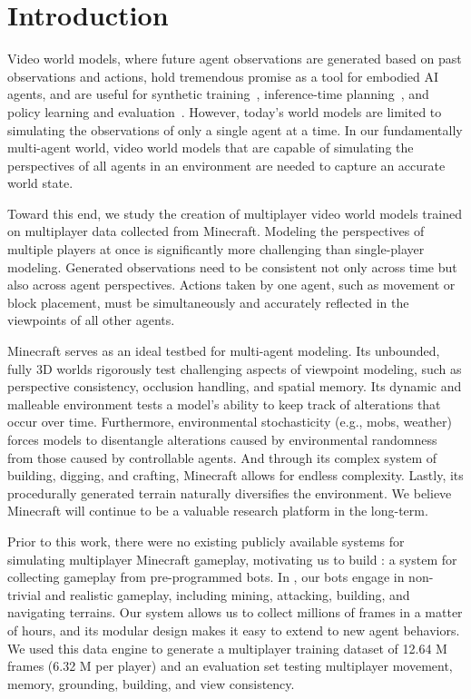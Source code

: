 \section{Introduction}
\label{sec:intro}


Video world models, where future agent observations are generated based on past observations and actions, hold tremendous promise as a tool for embodied AI agents, and are useful for synthetic training~\cite{ali2025world, yang2024video}, inference-time planning~\cite{zhou2024dino, assran2025v}, and policy learning and evaluation~\cite{du2023learning, jang2025dreamgen, quevedo2026worldgym}. However, today’s world models are limited to simulating the observations of only a single agent at a time. In our fundamentally multi-agent world, video world models that are capable of simulating the perspectives of all agents in an environment are needed to capture an accurate world state. 

Toward this end, we study the creation of multiplayer video world models trained on multiplayer data collected from Minecraft. Modeling the perspectives of multiple players at once is significantly more challenging than single-player modeling. Generated observations need to be consistent not only across time but also across agent perspectives. Actions taken by one agent, such as movement or block placement, must be simultaneously and accurately reflected in the viewpoints of all other agents.


Minecraft serves as an ideal testbed for multi-agent modeling. Its unbounded, fully 3D worlds rigorously test challenging aspects of viewpoint modeling, such as perspective consistency, occlusion handling, and spatial memory. Its dynamic and malleable environment tests a model’s ability to keep track of alterations that occur over time. Furthermore, environmental stochasticity (e.g., mobs, weather) forces models to disentangle alterations caused by environmental randomness from those caused by controllable agents. And through its complex system of building, digging, and crafting, Minecraft allows for endless complexity. Lastly, its procedurally generated terrain naturally diversifies the environment. We believe Minecraft will continue to be a valuable research platform in the long-term.





Prior to this work, there were no existing publicly available systems for simulating multiplayer Minecraft gameplay, motivating us to build \solarisengine: a system for collecting gameplay from pre-programmed bots. In \solarisengine, our bots engage in non-trivial and realistic gameplay, including mining, attacking, building, and navigating terrains. Our system allows us to collect millions of frames in a matter of hours, and its modular design makes it easy to extend to new agent behaviors. We used this data engine to generate a multiplayer training dataset of 12.64 M frames (6.32 M per player) and an evaluation set testing multiplayer movement, memory, grounding, building, and view consistency.

